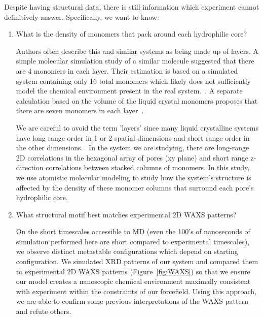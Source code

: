 \documentclass[journal=jpcbfk,manuscript=article]{achemso}
\begin{document}
 Despite having structural data, there is still information which experiment
 cannot definitively answer. Specifically, we want to know:
 \begin{enumerate}
    \item What is the density of monomers that pack around each hydrophilic core? 
    \label{point:monomernum}

 	Authors often describe this and similar systems as being made up of layers. A simple
 	molecular simulation study of a similar molecule suggested that there are 4 monomers
 	in each layer. Their estimation is based on a simulated system containing only 16 total
 	monomers which likely does not sufficiently model the chemical environment present in
 	the real system.~\cite{zhu_methacrylated_2006}. A separate calculation based on the 
 	volume of the liquid crystal monomers proposes that there are seven monomers in each 
 	layer~\cite{resel_structural_2000}. 

  	We are careful to avoid the term 'layers' since many liquid crystalline systems
 	have long range order in 1 or 2 spatial dimensions and short range order in 	
 	the other dimensions.~\cite{chaikin_principles_1995}  %
 	In the system we are studying, there are long-range 2D correlations in the 
 	hexagonal array of pores (xy plane) and short range z-direction correlations between 
        stacked columns of monomers. In this study, we use atomistic molecular modeling
        to study how the system's structure is affected by the density of these monomer columns
        that surround each pore's hydrophilic core. 

	\item What structural motif best matches experimental 2D WAXS patterns?\label{point:xrdmatch}

	On the short timescales accessible to MD (even the 100's of nanoseconds of simulation 
	performed here are short compared to experimental timescales), we observe distinct metastable
	configurations which depend on starting configuration. We simulated XRD patterns of our system and 
	compared them to experimental 2D WAXS patterns (Figure~\ref{fig:WAXS}) so that we ensure our
	model creates a nanoscopic chemical environment maximally consistent with experiment within 
	the constraints	of our forcefield. Using this approach, we are able to confirm some previous
	interpretations	of the WAXS pattern and refute others. 
	


\end{enumerate}
\end{document}
